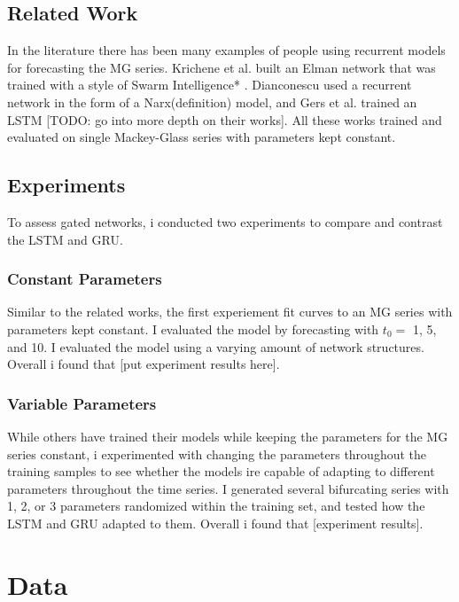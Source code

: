 \documentclass[11pt]{article}
\begin{document}
\subsection {Related Work}
In the literature there has been many examples of people using recurrent models for forecasting the MG series.
Krichene et al. built an Elman network that was trained with a style of Swarm Intelligence* \cite{Kirchene}. Dianconescu used a recurrent network in the form of a Narx(definition) model, and Gers et al. trained an LSTM [TODO: go into more depth on their works]. All these works trained and evaluated on single Mackey-Glass series with parameters kept constant.

\subsection{Experiments}

To assess gated networks, i conducted two experiments to compare and contrast the LSTM and GRU.

\subsubsection{Constant Parameters}
Similar to the related works, the first experiement fit curves to an
MG series with parameters kept constant. I evaluated the model by forecasting with $t_0=$ 1, 5, and
10. I evaluated the model using a varying amount of network
structures. Overall i found that [put experiment results here].

\subsubsection{Variable Parameters}
While others have trained their models while keeping the parameters
for the MG series constant, i experimented with changing the
parameters throughout the training samples to see whether the models ire
capable of adapting to different parameters throughout the time
series. I generated several bifurcating series with 1, 2, or 3
parameters randomized within the training set, and tested how the LSTM
and GRU adapted to them. Overall i found that [experiment results].



\section {Data}
\end{document}
